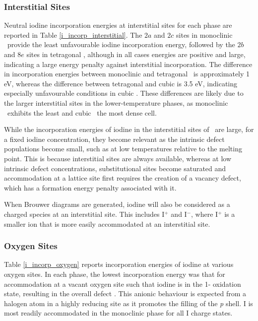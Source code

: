 \subsubsection*{Interstitial Sites}
Neutral iodine incorporation energies at interstitial sites for each phase are reported in Table \ref{i_incorp_interstitial}. The $2a$ and $2c$ sites in monoclinic \zirconia\ provide the least unfavourable iodine incorporation energy, followed by the $2b$ and $8e$ sites in tetragonal \zirconia , although in all cases energies are positive and large, indicating a large energy penalty against interstitial incorporation. The difference in incorporation energies between monoclinic and tetragonal \zirconia\ is approximately 1 eV, whereas the difference between tetragonal and cubic is 3.5 eV, indicating especially unfavourable conditions in cubic \zirconia . These differences are likely due to the larger interstitial sites in the lower-temperature phases, as monoclinic \zirconia\ exhibits the least and cubic \zirconia\ the most dense cell. 

While the incorporation energies of iodine in the interstitial sites of \zirconia\ are large, for a fixed iodine concentration, they become relevant as the intrinsic defect populations become small, such as at low temperatures relative to the melting point. This is because interstitial sites are always available, whereas at low intrinsic defect concentrations, substitutional sites become saturated and accommodation at a lattice site first requires the creation of a vacancy defect, which has a formation energy penalty associated with it. 

When Brouwer diagrams are generated, iodine will also be considered as a charged species at an interstitial site. This includes I$^{+}$ and I$^{-}$, where I$^{+}$ is a smaller ion that is more easily accommodated at an interstitial site.

\subsubsection*{Oxygen Sites}

Table \ref{i_incorp_oxygen} reports incorporation energies of iodine at various oxygen sites. In each phase, the lowest incorporation energy was that for accommodation at a vacant oxygen site such that iodine is in the 1- oxidation state, resulting in the overall defect . This anionic behaviour is expected from a halogen atom in a highly reducing site as it promotes the filling of the \emph{p} shell. I is most readily accommodated in the monoclinic phase for all I charge states.

